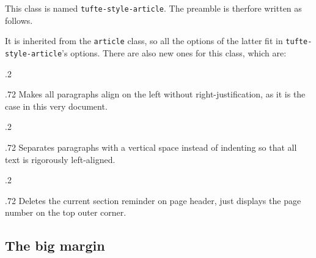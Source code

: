 \documentclass[raggedright, twoside, 11pt]{tufte-style-article}
\begin{document}
This class is named \texttt{tufte-style-article}. The preamble is therfore written as follows.

It is inherited from the \texttt{article} class, so all the options of the latter fit in \texttt{tufte-style-article}'s options. There are also new ones for this class, which are:

\medskip
\begin{minipagewithmarginpars}[t]{.2\textwidth}
	\raggedleft
\end{minipagewithmarginpars}\hfill%
\begin{minipagewithmarginpars}[t]{.72\textwidth}
	Makes all paragraphs align on the left without right-justification, as it is the case in this very document. \\
\end{minipagewithmarginpars}
\smallskip
\begin{minipagewithmarginpars}[t]{.2\textwidth}
	\raggedleft
\end{minipagewithmarginpars}\hfill%
\begin{minipagewithmarginpars}[t]{.72\textwidth}
	Separates paragraphs with a vertical space instead of indenting so that all text is rigorously left-aligned.
\end{minipagewithmarginpars}
\smallskip
\begin{minipagewithmarginpars}[t]{.2\textwidth}
	\raggedleft
\end{minipagewithmarginpars}\hfill%
\begin{minipagewithmarginpars}[t]{.72\textwidth}
	Deletes the current section reminder on page header, just displays the page number on the top outer corner.
\end{minipagewithmarginpars}



\subsection{The big margin}
\end{document}
